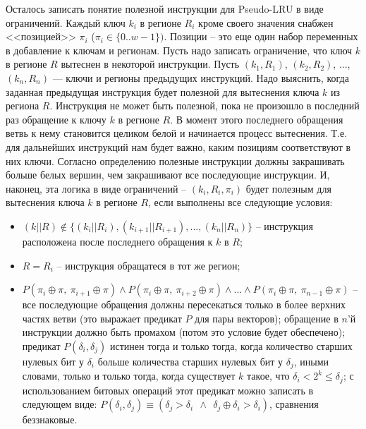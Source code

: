 \documentclass[14pt]{extreport}
\newcommand{\PseudoLRU}{\textsf{Pseudo-LRU}\xspace}
\begin{document}
Осталось записать понятие полезной инструкции для \PseudoLRU в виде
ограничений. Каждый ключ $k_i$ в регионе $R_i$ кроме своего значения
снабжен <<позицией>> $\pi_i$ ($\pi_i \in \{0..w{-}1\})$. Позиции -- это еще один набор переменных в добавление к ключам и регионам. Пусть надо записать ограничение, что ключ $k$ в регионе $R$ вытеснен в некоторой инструкции. Пусть $(k_1, R_1)$, $(k_2, R_2)$, ..., $(k_n, R_n)$ --- ключи и регионы предыдущих инструкций. Надо выяснить, когда заданная предыдущая инструкция будет полезной для вытеснения ключа $k$ из региона $R$. Инструкция не может быть полезной, пока не произошло в последний раз обращение к ключу $k$ в регионе $R$. В момент этого последнего обращения ветвь к нему становится целиком белой и начинается процесс вытеснения. Т.е. для дальнейших инструкций нам будет важно, каким позициям соответствуют в них ключи. Согласно определению полезные инструкции должны закрашивать больше белых вершин, чем закрашивают все последующие инструкции. И, наконец, эта логика в виде ограничений -- $(k_i, R_i, \pi_i)$ будет полезным для вытеснения ключа $k$ в регионе $R$, если выполнены все следующие условия:
\begin{itemize}
    \item $(k||R) \notin \{(k_i||R_i), (k_{i+1}||R_{i+1}), ..., (k_n||R_n)\}$ -- инструкция расположена после последнего обращения к $k$ в $R$;
    \item $R = R_i$ -- инструкция обращатеся в тот же регион;
    \item $P(\pi_i \oplus \pi,~\pi_{i+1} \oplus \pi) \wedge P(\pi_i \oplus \pi,~\pi_{i+2} \oplus \pi) \wedge ... \wedge P(\pi_i \oplus \pi,~\pi_{n-1} \oplus \pi)$ -- все последующие обращения должны пересекаться только в более верхних частях ветви (это выражает предикат $P$ для пары векторов); обращение в $n$'й инструкции должно быть промахом (потом это условие будет обеспечено); предикат $P(\delta_i, \delta_j)$ истинен тогда и только тогда, когда количество старших нулевых бит у $\delta_i$ больше количества старших нулевых бит у $\delta_j$, иными словами, только и только тогда, когда существует $k$ такое, что $\delta_i < 2^k \leqslant \delta_j$; с использованием битовых операций этот предикат можно записать в следующем виде: $P(\delta_i, \delta_j) \equiv (\delta_j > \delta_i~~\wedge~~\delta_j \oplus \delta_i > \delta_i)$, сравнения беззнаковые.
\end{itemize}
\end{document}
